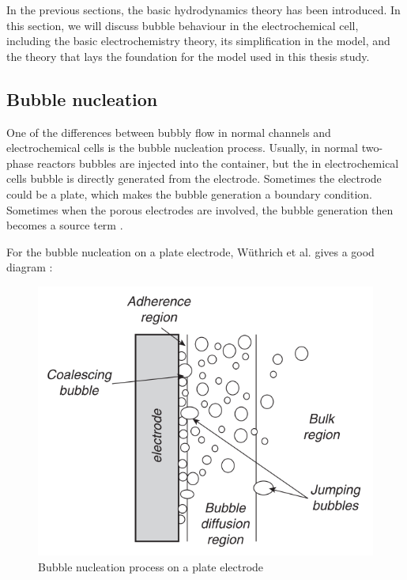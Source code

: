 In the previous sections, the basic hydrodynamics theory has been introduced. In this section, we will discuss bubble behaviour in the electrochemical cell, including the basic electrochemistry theory, its simplification in the model, and the theory that lays the foundation for the model used in this thesis study.

\subsection{Bubble nucleation}

One of the differences between bubbly flow in normal channels and electrochemical cells is the bubble nucleation process. Usually, in normal two-phase reactors bubbles are injected into the container, but the in electrochemical cells bubble is directly generated from the electrode. Sometimes the electrode could be a plate, which makes the bubble generation a boundary condition. Sometimes when the porous electrodes are involved, the bubble generation then becomes a source term \cite{charton2009hydrogen}.

For the bubble nucleation on a plate electrode, Wüthrich et al. gives a good diagram \cite{Wuthrich2015, L.J.J.Janssen1988}:

\begin{figure}[H]
    \centering
    \includegraphics{nucleation.png}
    \caption{Bubble nucleation process on a plate electrode \cite{Wuthrich2015}}
    \label{nucleation}
\end{figure}

